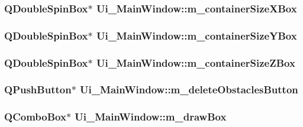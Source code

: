 \label{classUi__MainWindow_acec2335350b2a00960d8f6dc7a59a2a4}
\hypertarget{classUi__MainWindow_a38f97cea09f884843bb90a7c71093d78}{
\subsubsection[{m\_\-containerSizeXBox}]{\setlength{\rightskip}{0pt plus 5cm}QDoubleSpinBox$\ast$ {\bf Ui\_\-MainWindow::m\_\-containerSizeXBox}}}
\label{classUi__MainWindow_a38f97cea09f884843bb90a7c71093d78}
\hypertarget{classUi__MainWindow_a27bcf5d57831be2acc8043f2d6b91916}{
\subsubsection[{m\_\-containerSizeYBox}]{\setlength{\rightskip}{0pt plus 5cm}QDoubleSpinBox$\ast$ {\bf Ui\_\-MainWindow::m\_\-containerSizeYBox}}}
\label{classUi__MainWindow_a27bcf5d57831be2acc8043f2d6b91916}
\hypertarget{classUi__MainWindow_ad1e34c68f361631331d52954f0da3347}{
\subsubsection[{m\_\-containerSizeZBox}]{\setlength{\rightskip}{0pt plus 5cm}QDoubleSpinBox$\ast$ {\bf Ui\_\-MainWindow::m\_\-containerSizeZBox}}}
\label{classUi__MainWindow_ad1e34c68f361631331d52954f0da3347}
\hypertarget{classUi__MainWindow_ad1aa984f30af3df4d2727e31f38648fa}{
\subsubsection[{m\_\-deleteObstaclesButton}]{\setlength{\rightskip}{0pt plus 5cm}QPushButton$\ast$ {\bf Ui\_\-MainWindow::m\_\-deleteObstaclesButton}}}
\label{classUi__MainWindow_ad1aa984f30af3df4d2727e31f38648fa}
\hypertarget{classUi__MainWindow_aed4f32d456ab04871cd8d062baec1480}{
\subsubsection[{m\_\-drawBox}]{\setlength{\rightskip}{0pt plus 5cm}QComboBox$\ast$ {\bf Ui\_\-MainWindow::m\_\-drawBox}}}
